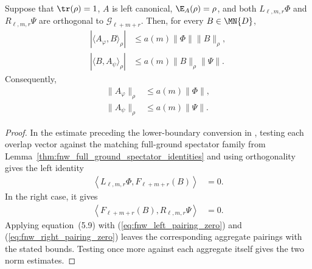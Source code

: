 \begin{lemma}
    \label{thm:fnw_aggregate_family_bounds}
    \leanok
    Suppose that $\tr(\rho)=1$, $A$ is left canonical,
    $\E_A(\rho)=\rho$, and both $L_{\ell,m,r}\Phi$ and
    $R_{\ell,m,r}\Psi$ are orthogonal to $\mathcal G_{\ell+m+r}$. Then, for
    every $B\in\MN{D}$,
    \begin{align}
        |\langle A_\varphi,B\rangle_\rho|
         & \leq a(m)\lVert\Phi\rVert\lVert B\rVert_\rho,
        \label{eq:fnw_left_aggregate_dual_bound}         \\
        |\langle B,A_\psi\rangle_\rho|
         & \leq a(m)\lVert B\rVert_\rho\lVert\Psi\rVert.
        \label{eq:fnw_right_aggregate_dual_bound}
    \end{align}
    Consequently,
    \begin{align}
        \lVert A_\varphi\rVert_\rho
         & \leq a(m)\lVert\Phi\rVert,
        \label{eq:fnw_left_aggregate_family_bound} \\
        \lVert A_\psi\rVert_\rho
         & \leq a(m)\lVert\Psi\rVert.
        \label{eq:fnw_right_aggregate_family_bound}
    \end{align}
\end{lemma}

\begin{proof}
    \leanok
    In the estimate preceding the lower-boundary conversion in
    \cite[Equation~(6.5)]{Fannes1992Finitely}, testing each overlap vector
    against the matching full-ground spectator family from
    Lemma~\ref{thm:fnw_full_ground_spectator_identities} and using
    orthogonality gives the left identity
    \begin{align}
        \left\langle L_{\ell,m,r}\Phi,F_{\ell+m+r}(B)\right\rangle
         & =0.
        \label{eq:fnw_left_pairing_zero}
    \end{align}
    In the right case, it gives
    \begin{align}
        \left\langle F_{\ell+m+r}(B),R_{\ell,m,r}\Psi\right\rangle
         & =0.
        \label{eq:fnw_right_pairing_zero}
    \end{align}
    Applying equation~(5.9) with
    (\ref{eq:fnw_left_pairing_zero}) and
    (\ref{eq:fnw_right_pairing_zero}) leaves the corresponding
    aggregate pairings with the stated bounds. Testing once more against each
    aggregate itself gives the two norm estimates.
\end{proof}

